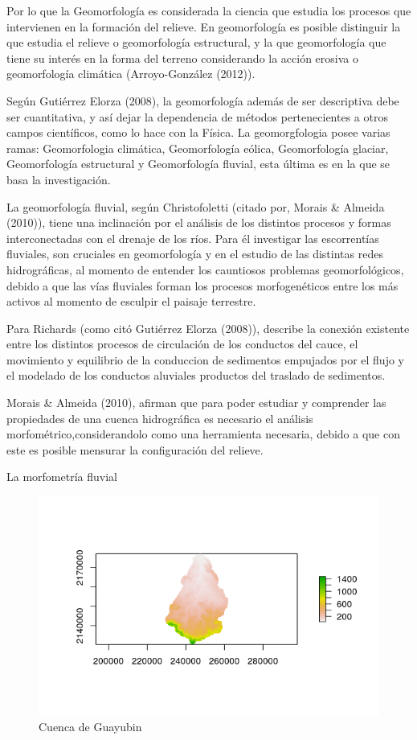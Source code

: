 \documentclass[11pt,]{article}
\begin{document}
Por lo que la Geomorfología es considerada la ciencia que estudia los
procesos que intervienen en la formación del relieve. En geomorfología
es posible distinguir la que estudia el relieve o geomorfología
estructural, y la que geomorfología que tiene su interés en la forma del
terreno considerando la acción erosiva o geomorfología climática
(Arroyo-González (2012)).

Según Gutiérrez Elorza (2008), la geomorfología además de ser
descriptiva debe ser cuantitativa, y así dejar la dependencia de métodos
pertenecientes a otros campos científicos, como lo hace con la Física.
La geomorgfologia posee varias ramas: Geomorfologia climática,
Geomorfología eólica, Geomorfología glaciar, Geomorfología estructural y
Geomorfología fluvial, esta última es en la que se basa la
investigación.

La geomorfología fluvial, según Christofoletti (citado por, Morais \&
Almeida (2010)), tiene una inclinación por el análisis de los distintos
procesos y formas interconectadas con el drenaje de los ríos. Para él
investigar las escorrentías fluviales, son cruciales en geomorfología y
en el estudio de las distintas redes hidrográficas, al momento de
entender los cauntiosos problemas geomorfológicos, debido a que las vías
fluviales forman los procesos morfogenéticos entre los más activos al
momento de esculpir el paisaje terrestre.

Para Richards (como citó Gutiérrez Elorza (2008)), describe la conexión
existente entre los distintos procesos de circulación de los conductos
del cauce, el movimiento y equilibrio de la conduccion de sedimentos
empujados por el flujo y el modelado de los conductos aluviales
productos del traslado de sedimentos.

Morais \& Almeida (2010), afirman que para poder estudiar y comprender
las propiedades de una cuenca hidrográfica es necesario el análisis
morfométrico,considerandolo como una herramienta necesaria, debido a que
con este es posible mensurar la configuración del relieve.

La morfometría fluvial

\begin{figure}
\centering
\includegraphics{cuenca_de_Guayubin_1sFig.png}
\caption{Cuenca de Guayubin}
\end{figure}
\end{document}
